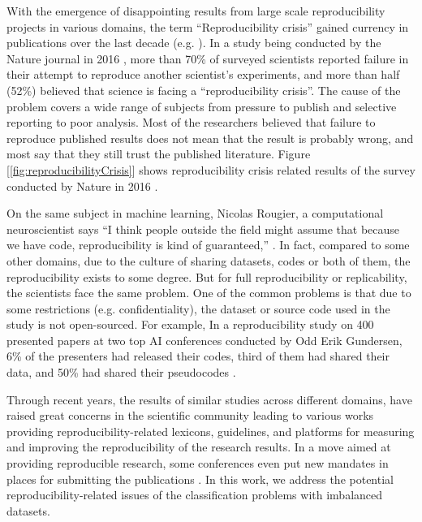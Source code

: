 With the emergence of disappointing results from large scale reproducibility projects in various domains, the term 
“Reproducibility crisis” gained currency in publications over the last decade (e.g. \cite{pashler_editors_2012}). 
In a study being conducted by the Nature journal in 2016 \cite{baker_1500_2016}, more than 70\% of surveyed scientists 
reported failure in their attempt to reproduce another scientist's experiments, and more than half (52\%) believed 
that science is facing a “reproducibility crisis”. The cause of the problem covers a wide range of subjects from 
pressure to publish and selective reporting to poor analysis. Most of the researchers believed that failure to reproduce 
published results does not mean that the result is probably wrong, and most say that they still trust the published 
literature. Figure [\ref{fig:reproducibilityCrisis}] shows reproducibility crisis related  results of the survey 
conducted by Nature in 2016 .

On the same subject in machine learning, Nicolas Rougier, a computational neuroscientist says “I think people 
outside the field might assume that because we have code, reproducibility is kind of guaranteed,” 
\cite{hutson_artificial_2018}. In fact, compared to some other domains, due to the culture of sharing datasets, 
codes or both of them, the reproducibility exists to some degree. But for full reproducibility or replicability, 
the scientists face the same problem. One of the common problems is that due to some restrictions (e.g. confidentiality), 
the dataset or source code used in the study is not open-sourced.  For example, In a reproducibility study on 400 
presented papers at two top AI conferences conducted by Odd Erik Gundersen, 6\% of the presenters had released 
their codes, third of them had shared their data, and 50\% had shared their pseudocodes \cite{gundersen_state_2018}.

Through recent years, the results of similar studies across different domains, have raised great concerns in the scientific 
community leading to various works providing reproducibility-related lexicons, guidelines, and platforms for measuring and 
improving the reproducibility of the research results. In a move aimed at providing reproducible research, some conferences 
even put new mandates in places for submitting the publications 
\cite{pineau_improving_2020,goodman_what_2016,tatman_practical_2018}. In this work, we address the potential 
reproducibility-related issues of the classification problems with imbalanced datasets. 

